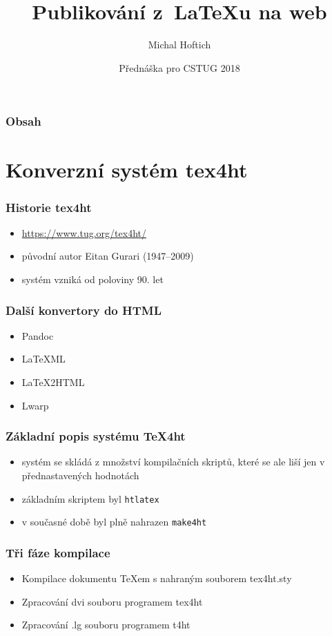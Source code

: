 \documentclass[czech]{beamer}
\title{Publikování z~\LaTeX u na web}
\author{Michal Hoftich\inst{1}}
\institute{
  \inst{1}
  <\url{michal.h21@gmail.com}>\\
  Ústřední knihovna PedF UK
}
\date{Přednáška pro CSTUG 2018}
\begin{document}
\frame{\titlepage}

\begin{frame}
  \frametitle{Obsah}
  \tableofcontents
\end{frame}


\section{Konverzní systém tex4ht}


\begin{frame}
  \frametitle{Historie tex4ht}
  \begin{itemize}
    \item \url{https://www.tug.org/tex4ht/}
    \item původní autor Eitan Gurari (1947--2009)
    \item systém vzniká od poloviny 90. let
  \end{itemize}
\end{frame}

\begin{frame}
  \frametitle{Další konvertory do HTML}
  \begin{itemize}
    \item Pandoc
    \item LaTeXML
    \item LaTeX2HTML
    \item Lwarp
  \end{itemize}
\end{frame}

\begin{frame}

  \frametitle{Základní popis systému TeX4ht}
  \begin{itemize}
    \item systém se skládá z množství kompilačních skriptů, které se ale liší
      jen v přednastavených hodnotách
  \item základním skriptem byl \texttt{htlatex} 
  \item v současné době byl plně nahrazen \texttt{make4ht}
\end{itemize}
\end{frame}


\begin{frame}
  \frametitle{Tři fáze kompilace}
  \begin{itemize}
    \item Kompilace dokumentu TeXem s nahraným souborem tex4ht.sty
    \item Zpracování dvi souboru programem tex4ht
    \item Zpracování .lg souboru programem t4ht
\end{itemize}
\end{frame}
\end{document}

